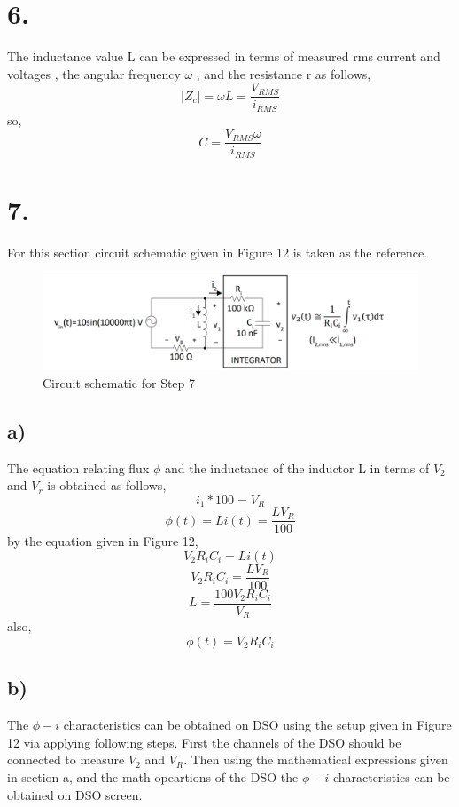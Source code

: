\documentclass[letterpaper,12pt]{article}
\begin{document}
\section{6.}
The inductance value L can be expressed in terms of measured rms current and voltages , the angular frequency \(\omega\) , and the resistance r as follows,
\[|Z_c| = \omega L = \frac{V_{RMS}}{i_{RMS}}\]
so,
\[C = \frac{V_{RMS} \omega}{i_{RMS}}
	\]
\section{7.}
	For this section circuit schematic given in Figure 12 is taken as the reference.
	\begin{figure}[H]
		\centering
	   \includegraphics[width=1\textwidth]{PRE7.png}
	   \caption{Circuit schematic for Step 7}
	\end{figure} 
	\subsection{a)}
	The equation relating flux \(\phi\) and the inductance of the inductor L in terms of \(V_2\) and \(V_r\) is obtained as follows,
\[
i_1*100 = V_R
\]
\[
	\phi(t) = L i(t) = \frac{L V_R}{100}
\]
by the equation given in Figure 12,
\[V_2 R_i C_i = L i(t)\]
\[V_2 R_i C_i = \frac{L V_R}{100}\]
\[L = \frac{100 V_2 R_i C_i}{V_R}\]
also,
\[\phi(t) = V_2 R_i C_i\]
\subsection{b)}

The \(\phi-i\) characteristics can be obtained on DSO using the setup given in Figure 12 via applying following steps. First the channels of the DSO should be connected to measure \(V_2\) and \(V_R\). Then using the mathematical expressions given in section a, and the math opeartions of the DSO the \(\phi-i\) characteristics can be obtained on DSO screen.
\end{document}

